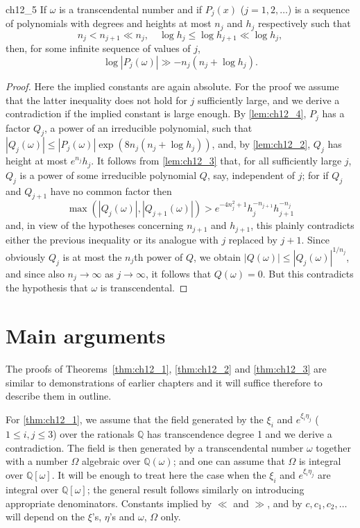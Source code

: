 \begin{mylemma}{}{ch12_5}
If $\omega$ is a transcendental number and if $P_j(x)$ ($j = 1, 2, \ldots$) is a sequence of polynomials with degrees and heights at most $n_j$ and $h_j$ respectively such that
\[n_j < n_{j+1} \ll n_j, \quad \log h_j \leqslant \log h_{j+1} \ll \log h_j,\]
then, for some infinite sequence of values of $j$,
\[\log |P_j(\omega)| \gg -n_j(n_j + \log h_j).\]
\end{mylemma}

\begin{proof}
Here the implied constants are again absolute. For the proof we assume that the latter inequality does not hold for $j$ sufficiently large, and we derive a contradiction if the implied constant is large enough. By \autoref{lem:ch12_4}, $P_j$ has a factor $Q_j$, a power of an irreducible polynomial, such that $|Q_j(\omega)| \le |P_j(\omega)| \exp(8n_j(n_j + \log h_j))$, and, by \autoref{lem:ch12_2}, $Q_j$ has height at most $e^{n_j} h_j$. It follows from \autoref{lem:ch12_3} that, for all sufficiently large $j$, $Q_j$ is a power of some irreducible polynomial $Q$, say, independent of $j$; for if $Q_j$ and $Q_{j+1}$ have no common factor then
\[\max(|Q_j(\omega)|, |Q_{j+1}(\omega)|) > e^{-4n_j^2+1} h_j^{-n_{j+1}} h_{j+1}^{-n_j}\]
and, in view of the hypotheses concerning $n_{j+1}$ and $h_{j+1}$, this plainly contradicts either the previous inequality or its analogue with $j$ replaced by $j+1$. Since obviously $Q_j$ is at most the $n_j$th power of $Q$, we obtain $|Q(\omega)| \le |Q_j(\omega)|^{1/n_j}$, and since also $n_j \to \infty$ as $j \to \infty$, it follows that $Q(\omega) = 0$. But this contradicts the hypothesis that $\omega$ is transcendental.
\end{proof}

\section{Main arguments}

The proofs of Theorems~\ref{thm:ch12_1}, \ref{thm:ch12_2} and \ref{thm:ch12_3} are similar to demonstrations of earlier chapters and it will suffice therefore to describe them in outline.

For \autoref{thm:ch12_1}, we assume that the field generated by the $\xi_i$ and $e^{\xi_i \eta_j}$ ($1 \le i, j \le 3$) over the rationals $\mathbb{Q}$ has transcendence degree 1 and we derive a contradiction. The field is then generated by a transcendental number $\omega$ together with a number $\Omega$ algebraic over $\mathbb{Q}(\omega)$; and one can assume that $\Omega$ is integral over $\mathbb{Q}[\omega]$. It will be enough to treat here the case when the $\xi_i$ and $e^{\xi_i \eta_j}$ are integral over $\mathbb{Q}[\omega]$; the general result follows similarly on introducing appropriate denominators. Constants implied by $\ll$ and $\gg$, and by $c, c_1, c_2, \dots$ will depend on the $\xi$'s, $\eta$'s and $\omega$, $\Omega$ only.

